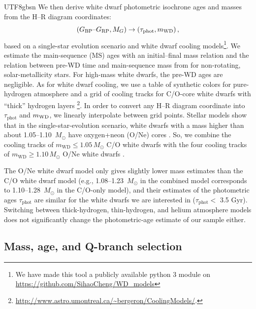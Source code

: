 \documentclass[twocolumn, times, trackchanges]{aastex63_bren}
\newcommand{\WDmodelsurl}{\href{https://github.com/SihaoCheng/WD_models}{\url{https://github.com/SihaoCheng/WD_models}}}
\newcommand{\wdurl}{\href{http://www.astro.umontreal.ca/~bergeron/CoolingModels/}{\url{http://www.astro.umontreal.ca/~bergeron/CoolingModels/}}}
\begin{document}
\begin{CJK*}{UTF8}{gbsn}
We then derive white dwarf photometric isochrone ages and masses from the H--R diagram coordinates:
\begin{equation}
    (G_{\rm BP}\text{--}G_{\rm RP}, M_G)\rightarrow (\tau_\text{phot}, m_\text{WD})\,, 
\end{equation}
based on a single-star evolution scenario and white dwarf cooling models\footnote{We have made this tool a publicly available python 3 module on \WDmodelsurl}. We estimate the main-sequence (MS) ages with an initial--final mass relation \citep{Cummings_2018} and the relation between pre-WD time and main-sequence mass from \citet{Choi_2016} for non-rotating, solar-metallicity stars. For high-mass white dwarfs, the pre-WD ages are negligible. As for white dwarf cooling, we use a table of synthetic colors for pure-hydrogen atmosphere \citep{Holberg_2006, Kowalski_2006, Tremblay_2011} and a grid of cooling tracks for C/O-core white dwarfs with ``thick'' hydrogen layers \citep{Fontaine_2001}\footnote{\wdurl.}. In order to convert any H--R diagram coordinate into $\tau_\text{phot}$ and $m_{\rm{WD}}$, we linearly interpolate between grid points. Stellar models show that in the single-star-evolution scenario, white dwarfs with a mass higher than about 1.05--1.10~$M_\odot$ have oxygen+neon (O/Ne) cores \citep[e.g.,][]{Siess_2007,Lauffer_2018}. So, we combine the cooling tracks of $m_\text{WD}\leq1.05\,M_\odot$ C/O white dwarfs with the four cooling tracks of $m_\text{WD}\geq1.10\,M_\odot$ O/Ne white dwarfs \citep{Camisassa_2019}. 

The O/Ne white dwarf model only gives slightly lower mass estimates than the C/O white dwarf model (e.g., 1.08--1.23~$M_\odot$ in the combined model corresponds to 1.10--1.28~$M_\odot$ in the C/O-only model), and their estimates of the photometric ages $\tau_\text{phot}$ are similar for the white dwarfs we are interested in ($\tau_\text{phot}<$ 3.5 Gyr). Switching between thick-hydrogen, thin-hydrogen, and helium atmosphere \citep{Bergeron_2011} models does not significantly change the photometric-age estimate of our sample either. 

\subsection{Mass, age, and Q-branch selection}
\label{sec:sample selection}


\end{CJK*}
\end{document}
